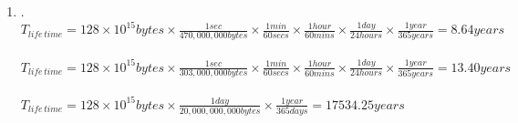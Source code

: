 \documentclass{article}
\begin{document}
\begin{enumerate}[label=\textbf{\Alph*.}]
	\item . \\
	$T_{life\,time} = 128 \times 10^{15} bytes \times \frac{1sec}{470,000,000bytes} \times
	\frac{1min}{60secs} \times \frac{1hour}{60mins} \times \frac{1day}{24hours} \times
	\frac{1year}{365years} = 8.64years$ \\
	\\
	$T_{life\,time} = 128 \times 10^{15} bytes \times \frac{1sec}{303,000,000bytes} \times
	\frac{1min}{60secs} \times \frac{1hour}{60mins} \times \frac{1day}{24hours} \times
	\frac{1year}{365years} = 13.40years$ \\
	\\
	$T_{life\,time} = 128 \times 10^{15} bytes \times \frac{1day}{20,000,000,000bytes} \times
	\frac{1year}{365days} = 17534.25years$ \\
\end{enumerate}
\end{document}
